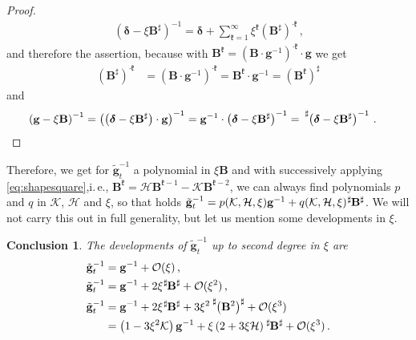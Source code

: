 \documentclass[a4paper,10pt]{scrartcl}
\newcommand{\landau}{\mathcal{O}}
\newcommand{\gb}{\mathbf{g}}
\newcommand{\tgb}{\tilde{\gb}}
\newcommand{\Bb}{\mathbf{B}}
\newcommand{\deltab}{\bm{\delta}}
\newcommand{\meanc}{\mathcal{H}}
\newcommand{\gaussc}{\mathcal{K}}
\newcommand{\frakk}{\mathfrak{k}}
\newcommand{\formComma}{\,\text{,}}
\newcommand{\formPeriod}{\,\text{.}}
\newcommand{\ie}{i.\,e.}%
\newtheorem{conclusion}{Conclusion}
\begin{document}
\begin{proof}
  \begin{align}
    \left( \deltab - \xi\Bb^{\sharp} \right)^{-1} = \deltab + \sum_{\frakk = 1}^{\infty}\xi^{\frakk}\left( \Bb^{\sharp} \right)^{\cdot\frakk} \formComma
  \end{align}
  and therefore the assertion, 
  because 
  with \( \Bb^{\frakk}  = \left( \Bb\cdot\gb^{-1} \right)^{\cdot\frakk} \cdot \gb\) we get
  \begin{align}
    \left( \Bb^{\sharp} \right)^{\cdot\frakk} &= \left( \Bb\cdot\gb^{-1} \right)^{\cdot\frakk} = \Bb^{\frakk}\cdot\gb^{-1} = \left( \Bb^{\frakk} \right)^{\sharp}
  \end{align}
  and
  \begin{align}
    \left( \gb - \xi\Bb \right)^{-1} 
          &= \left( \left( \deltab - \xi\Bb^{\sharp} \right)\cdot \gb \right)^{-1}
          = \gb^{-1} \cdot \left( \deltab - \xi\Bb^{\sharp} \right)^{-1}
          = \tensor[^{\sharp}]{\left( \deltab - \xi\Bb^{\sharp} \right)}{^{-1}} \formPeriod
  \end{align}
\end{proof}
Therefore, we get for \( \tgb_{t}^{-1} \) a polynomial in \( \xi\Bb \) and with successively applying \eqref{eq:shapesquare},\ie,
\( \Bb^{\frakk} = \meanc\Bb^{\frakk-1} - \gaussc\Bb^{\frakk-2} \), we can always find
polynomials \( p \) and \( q \) in \( \gaussc \), \( \meanc \) and \( \xi \), so that holds
\( \tgb_{t}^{-1} = p(\gaussc, \meanc, \xi)\gb^{-1} + q(\gaussc, \meanc, \xi)\tensor[^{\sharp}]{\Bb}{^{\sharp}} \).
We will not carry this out in full generality, but let us mention some developments in \( \xi \).
\begin{conclusion}
  The developments of \( \tgb_{t}^{-1} \) up to second degree in \( \xi \) are
  \begin{align}
    \tgb_{t}^{-1} &= \gb^{-1} + \landau(\xi)\formComma\\
    \tgb_{t}^{-1} &= \gb^{-1} + 2\xi\tensor[^{\sharp}]{\Bb}{^{\sharp}} + \landau(\xi^{2})\formComma \\
    \tgb_{t}^{-1} &= \gb^{-1} + 2\xi\tensor[^{\sharp}]{\Bb}{^{\sharp}} +  3\xi^{2}\tensor[^{\sharp}]{\left( \Bb^{2} \right)}{^{\sharp}} + \landau(\xi^{3})\\
                  &= \left( 1 - 3 \xi^{2}\gaussc \right)\gb^{-1} + \xi\left( 2 + 3\xi\meanc \right)\tensor[^{\sharp}]{\Bb}{^{\sharp}} + \landau(\xi^{3}) \formPeriod
  \end{align}
\end{conclusion}
\end{document}
